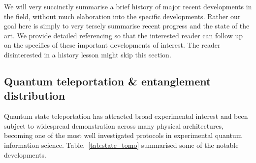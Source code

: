 \documentclass[aps, rmp, twocolumn, amsmath, amssymb, nofootinbib, superscriptaddress, longbibliography, floatfix, table-of-contents, eqsecnum]{revtex4-1}
\begin{document}
We will very succinctly summarise a brief history of major recent developments in the field, without much elaboration into the specific developments. Rather our goal here is simply to very tersely summarise recent progress and the state of the art. We provide detailed referencing so that the interested reader can follow up on the specifics of these important developments of interest. The reader disinterested in a history lesson might skip this section.

%
%

\subsection{Quantum teleportation \& entanglement distribution}   

Quantum state teleportation has attracted broad experimental interest and been subject to widespread demonstration across many physical architectures, becoming one of the most well investigated protocols in experimental quantum information science. Table.~\ref{tab:state_tomo} summarised some of the notable developments.
\end{document}
